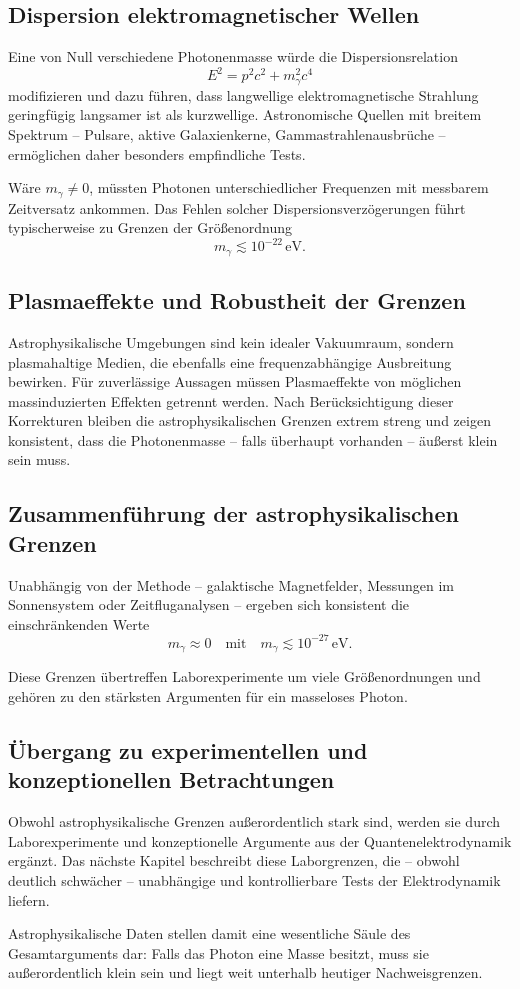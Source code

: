 \subsection*{Dispersion elektromagnetischer Wellen}

Eine von Null verschiedene Photonenmasse würde die Dispersionsrelation
\[
E^2 = p^2 c^2 + m_\gamma^2 c^4
\]
modifizieren und dazu führen, dass langwellige elektromagnetische Strahlung 
geringfügig langsamer ist als kurzwellige. Astronomische Quellen mit 
breitem Spektrum – Pulsare, aktive Galaxienkerne, Gammastrahlenausbrüche – 
ermöglichen daher besonders empfindliche Tests.

Wäre $m_\gamma \neq 0$, müssten Photonen unterschiedlicher Frequenzen mit 
messbarem Zeitversatz ankommen. Das Fehlen solcher Dispersionsverzögerungen 
führt typischerweise zu Grenzen der Größenordnung
\[
m_\gamma \lesssim 10^{-22}\,\text{eV}.
\]

\subsection*{Plasmaeffekte und Robustheit der Grenzen}

Astrophysikalische Umgebungen sind kein idealer Vakuumraum, sondern 
plasmahaltige Medien, die ebenfalls eine frequenzabhängige Ausbreitung 
bewirken. Für zuverlässige Aussagen müssen Plasmaeffekte von möglichen 
massinduzierten Effekten getrennt werden.  
Nach Berücksichtigung dieser Korrekturen bleiben die astrophysikalischen 
Grenzen extrem streng und zeigen konsistent, dass die Photonenmasse – falls 
überhaupt vorhanden – äußerst klein sein muss.

\subsection*{Zusammenführung der astrophysikalischen Grenzen}

Unabhängig von der Methode – galaktische Magnetfelder, Messungen im 
Sonnensystem oder Zeitfluganalysen – ergeben sich konsistent die 
einschränkenden Werte
\[
m_\gamma \approx 0 
\quad \text{mit} \quad 
m_\gamma \lesssim 10^{-27}\,\text{eV}.
\]

Diese Grenzen übertreffen Laborexperimente um viele Größenordnungen und 
gehören zu den stärksten Argumenten für ein masseloses Photon.

\subsection*{Übergang zu experimentellen und konzeptionellen Betrachtungen}

Obwohl astrophysikalische Grenzen außerordentlich stark sind, werden sie 
durch Laborexperimente und konzeptionelle Argumente aus der 
Quantenelektrodynamik ergänzt. Das nächste Kapitel beschreibt diese 
Laborgrenzen, die – obwohl deutlich schwächer – unabhängige und 
kontrollierbare Tests der Elektrodynamik liefern.

Astrophysikalische Daten stellen damit eine wesentliche Säule des 
Gesamtarguments dar: Falls das Photon eine Masse besitzt, muss sie 
außerordentlich klein sein und liegt weit unterhalb heutiger 
Nachweisgrenzen.

